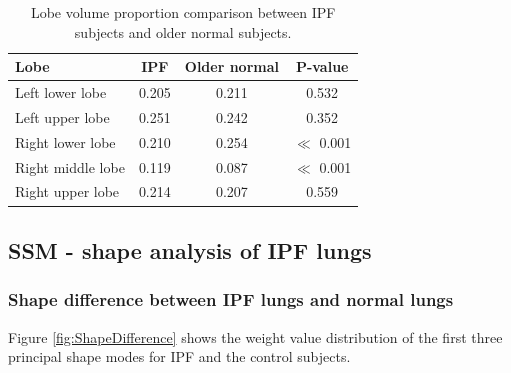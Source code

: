 \begin{table}[htbp]
\centering
\caption{Lobe volume proportion comparison between IPF subjects and older normal subjects.}
\label{tab:LobeVolumeComparison}
\begin{tabular}{| l | c | c | c |}
\hline
\bf{Lobe} & \bf{IPF} & \bf{Older normal} & \bf{P-value}\\
\hline
Left lower lobe & 0.205 & 0.211 & 0.532\\
\hline
Left upper lobe	& 0.251 & 0.242 & 0.352\\
\hline
Right lower lobe	& 0.210 & 0.254 & $\ll$ 0.001\\
\hline
Right middle lobe	& 0.119 & 0.087 & $\ll$ 0.001\\
\hline
Right upper lobe	& 0.214 & 0.207 & 0.559\\
\hline
\end{tabular}
\end{table}

\subsection{SSM - shape analysis of IPF lungs} \label{SSMBasedShapeAnalysis}
\subsubsection{Shape difference between IPF lungs and normal lungs}
Figure \ref{fig:ShapeDifference} shows the weight value distribution of the first three principal shape modes for IPF and the control subjects. 


